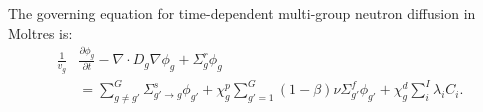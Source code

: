 The governing equation for time-dependent multi-group neutron diffusion in
Moltres is:
%
\begin{align}
	\frac{1}{v_g} &\frac{\partial \phi_g}{\partial t} - \nabla \cdot D_g
	\nabla \phi_g + \Sigma^r_g \phi_g \nonumber \\ 
	&= \sum^G_{g \neq g'} \Sigma^s_{g' \rightarrow g} \phi_{g'} + \chi^p_g
	\sum^G_{g'=1} (1-\beta) \nu \Sigma^f_{g'} \phi_{g'} + \chi^d_g \sum^I_i
	\lambda_i C_i. \label{eq1}
\end{align}

